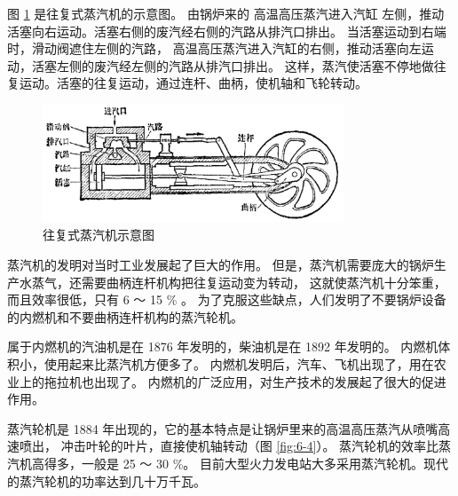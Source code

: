 
图 \ref{fig:6-3} 是往复式蒸汽机的示意图。
由锅炉来的
高温高压蒸汽进入汽缸  左侧，推动活塞向右运动。活塞右侧的废汽经右侧的汽路从排汽口排出。
当活塞运动到右端时，滑动阀遮住左侧的汽路，
高温高压蒸汽进入汽缸的右侧，推动活塞向左运动，活塞左侧的废汽经左侧的汽路从排汽口排出。
这样，蒸汽使活塞不停地做往复运动。活塞的往复运动，通过连杆、曲柄，使机轴和飞轮转动。

\begin{figure}[htbp]
    \centering
    \includegraphics[width=0.8\textwidth]{../pic/czwl2-ch6-3}
    \caption{往复式蒸汽机示意图}\label{fig:6-3}
\end{figure}

蒸汽机的发明对当时工业发展起了巨大的作用。
但是，蒸汽机需要庞大的锅炉生产水蒸气，还需要曲柄连杆机构把往复运动变为转动，
这就使蒸汽机十分笨重，而且效率很低，只有 6 ～ 15 \% 。
为了克服这些缺点，人们发明了不要锅炉设备的内燃机和不要曲柄连杆机构的蒸汽轮机。

属于内燃机的汽油机是在 1876 年发明的，柴油机是在 1892 年发明的。
内燃机体积小，使用起来比蒸汽机方便多了。
内燃机发明后，汽车、飞机出现了，用在农业上的拖拉机也出现了。
内燃机的广泛应用，对生产技术的发展起了很大的促进作用。

蒸汽轮机是 1884 年出现的，它的基本特点是让锅炉里来的高温高压蒸汽从喷嘴高速喷出，
冲击叶轮的叶片，直接使机轴转动（图 \ref{fig:6-4}）。
蒸汽轮机的效率比蒸汽机高得多，一般是 25 ～ 30 \%。
目前大型火力发电站大多采用蒸汽轮机。现代的蒸汽轮机的功率达到几十万千瓦。

